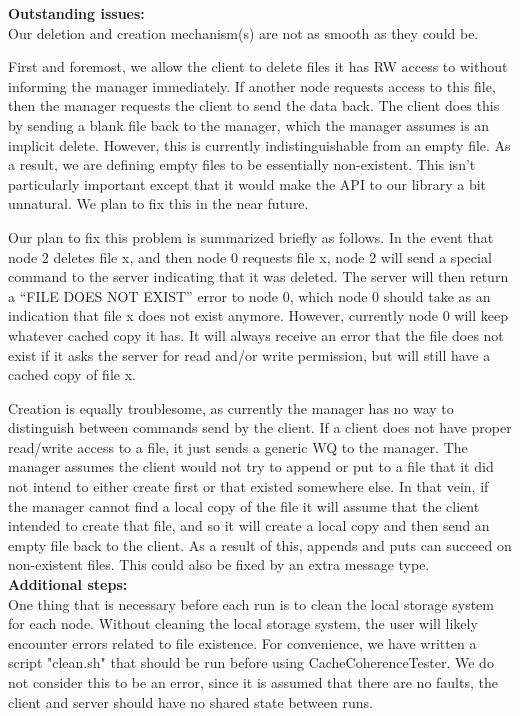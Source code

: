 \documentclass[11pt]{article}
\begin{document}
\textbf{Outstanding issues:} \\

Our deletion and creation mechanism(s) are not as smooth as they could be.

First and foremost, we allow the client to delete files it has RW access to without informing the manager immediately. If another node requests
access to this file, then the manager requests the client to send the data back. The client does this by sending a blank file back to the 
manager, which the manager assumes is an implicit delete. However, this is currently indistinguishable from an empty file. As a result, we are defining
empty files to be essentially non-existent. This isn't particularly important except that it would make the API to our library a bit unnatural.
We plan to fix this in the near future.

Our plan to fix this problem is summarized briefly as follows. In the event that node 2 deletes file x, and then node 0 requests file x, node 2 will send a 
special command to the server indicating that it was deleted. The server will then return a “FILE DOES NOT EXIST” error to node 0, which node 0 should 
take as an indication that file x does not exist anymore. However, currently node 0 will keep whatever cached copy it has. It will always receive 
an error that the file does not exist if it asks the server for read and/or write permission, but will still have a cached copy of file x.

Creation is equally troublesome, as currently the manager has no way to distinguish between commands send by the client. If a client does not have 
proper read/write access to a file, it just sends a generic WQ to the manager. The manager assumes the client would not try to append or put to a file that it did not intend to either create first
or that existed somewhere else. In that vein, if the manager cannot find a local copy of the file
it will assume that the client intended to create that file, and so it will create a local
copy and then send an empty file back to the client. As a result of this, appends and puts can succeed on non-existent files. This could also be fixed by an extra message type. \\

\textbf{Additional steps:} \\

One thing that is necessary before each run is to clean the local storage system for each node. Without cleaning the local storage system, the user will likely encounter errors related to file existence. For convenience, we have written a script "clean.sh" that should be run before using CacheCoherenceTester. We do not consider this to be an error, since it is assumed that there are no faults, the client and server should have no shared state between runs. \\
\end{document}
